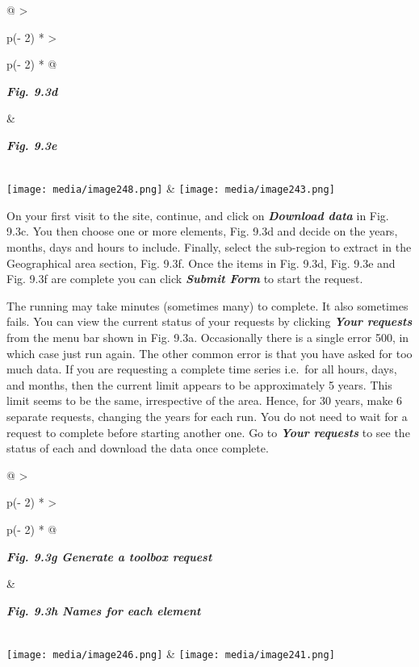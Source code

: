 \documentclass[
  letterpaper,
  DIV=11,
  numbers=noendperiod]{scrreprt}
\begin{document}
\begin{longtable}[]{@{}
  >{\raggedright\arraybackslash}p{(\columnwidth - 2\tabcolsep) * }
  >{\raggedright\arraybackslash}p{(\columnwidth - 2\tabcolsep) * }@{}}
\toprule\noalign{}
\begin{minipage}[b]{\linewidth}\raggedright
\textbf{\emph{Fig. 9.3d}}
\end{minipage} & \begin{minipage}[b]{\linewidth}\raggedright
\textbf{\emph{Fig. 9.3e}}
\end{minipage} \\
\midrule\noalign{}
\endhead
\bottomrule\noalign{}
\endlastfoot
\texttt{[image: media/image248.png]} &
\texttt{[image: media/image243.png]} \\
\end{longtable}

On your first visit to the site, continue, and click on
\textbf{\emph{Download data}} in Fig. 9.3c. You then choose one or more
elements, Fig. 9.3d and decide on the years, months, days and hours to
include. Finally, select the sub-region to extract in the Geographical
area section, Fig. 9.3f. Once the items in Fig. 9.3d, Fig. 9.3e and Fig.
9.3f are complete you can click \textbf{\emph{Submit Form}} to start the
request.

The running may take minutes (sometimes many) to complete. It also
sometimes fails. You can view the current status of your requests by
clicking \textbf{\emph{Your requests}} from the menu bar shown in Fig.
9.3a. Occasionally there is a single error 500, in which case just run
again. The other common error is that you have asked for too much data.
If you are requesting a complete time series i.e.~for all hours, days,
and months, then the current limit appears to be approximately 5 years.
This limit seems to be the same, irrespective of the area. Hence, for 30
years, make 6 separate requests, changing the years for each run. You do
not need to wait for a request to complete before starting another one.
Go to \textbf{\emph{Your requests}} to see the status of each and
download the data once complete.

\begin{longtable}[]{@{}
  >{\raggedright\arraybackslash}p{(\columnwidth - 2\tabcolsep) * }
  >{\raggedright\arraybackslash}p{(\columnwidth - 2\tabcolsep) * }@{}}
\toprule\noalign{}
\begin{minipage}[b]{\linewidth}\raggedright
\textbf{\emph{Fig. 9.3g Generate a toolbox request}}
\end{minipage} & \begin{minipage}[b]{\linewidth}\raggedright
\textbf{\emph{Fig. 9.3h Names for each element}}
\end{minipage} \\
\midrule\noalign{}
\endhead
\bottomrule\noalign{}
\endlastfoot
\texttt{[image: media/image246.png]} &
\texttt{[image: media/image241.png]} \\
\end{longtable}
\end{document}

